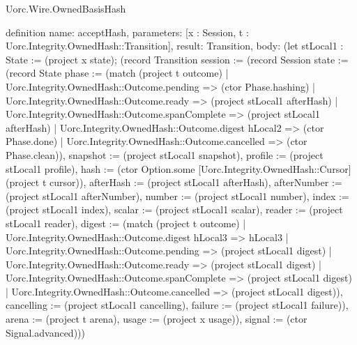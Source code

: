 \begin{lexlean}{Uorc.Wire.OwnedBasisHash}
\begin{semanticmodule}
definition{
  name: acceptHash,
  parameters: [x : Session, t : Uorc.Integrity.OwnedHash::Transition],
  result: Transition,
  body: (let stLocal1 : State := (project x state); (record Transition {session := (record Session {state := (record State {phase := (match (project t outcome)
    | Uorc.Integrity.OwnedHash::Outcome.pending => (ctor Phase.hashing)
    | Uorc.Integrity.OwnedHash::Outcome.ready => (project stLocal1 afterHash)
    | Uorc.Integrity.OwnedHash::Outcome.spanComplete => (project stLocal1 afterHash)
    | Uorc.Integrity.OwnedHash::Outcome.digest hLocal2 => (ctor Phase.done)
    | Uorc.Integrity.OwnedHash::Outcome.cancelled => (ctor Phase.clean)), snapshot := (project stLocal1 snapshot), profile := (project stLocal1 profile), hash := (ctor Option.some [Uorc.Integrity.OwnedHash::Cursor] (project t cursor)), afterHash := (project stLocal1 afterHash), afterNumber := (project stLocal1 afterNumber), number := (project stLocal1 number), index := (project stLocal1 index), scalar := (project stLocal1 scalar), reader := (project stLocal1 reader), digest := (match (project t outcome)
    | Uorc.Integrity.OwnedHash::Outcome.digest hLocal3 => hLocal3
    | Uorc.Integrity.OwnedHash::Outcome.pending => (project stLocal1 digest)
    | Uorc.Integrity.OwnedHash::Outcome.ready => (project stLocal1 digest)
    | Uorc.Integrity.OwnedHash::Outcome.spanComplete => (project stLocal1 digest)
    | Uorc.Integrity.OwnedHash::Outcome.cancelled => (project stLocal1 digest)), cancelling := (project stLocal1 cancelling), failure := (project stLocal1 failure)}), arena := (project t arena), usage := (project x usage)}), signal := (ctor Signal.advanced)}))
}


\end{semanticmodule}
\end{lexlean}
